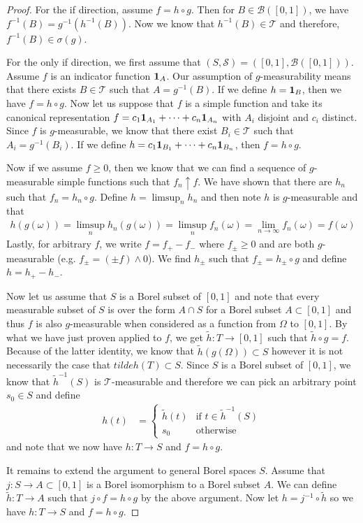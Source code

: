 \documentclass{amsart}
\theoremstyle{remark}
\theoremstyle{definition}
\begin{document}
\begin{proof}
For the if direction, assume $f = h \circ g$.  Then for $B \in
\mathcal{B}([0,1])$, we have $f^{-1}(B) = g^{-1}(h^{-1}(B))$.  Now we know
that $h^{-1}(B) \in \mathcal{T}$ and therefore, $f^{-1}(B) \in
\sigma(g)$.

For the only if direction, we first assume that $(S, \mathcal{S})
=([0,1], \mathcal{B}([0,1]))$.  
Assume $f$ is an indicator
function $\textbf{1}_{A}$.  Our assumption of $g$-measurability
means that there exists $B \in \mathcal{T}$ such that $A =
g^{-1}(B)$.  If we define $h = \textbf{1}_{B}$, then we have $f =
h \circ g$.  Now let us suppose that $f$ is a simple function and take
its canonical representation $f = c_1 \textbf{1}_{A_1} + \cdots + c_n
\textbf{1}_{A_n}$ with $A_i$ disjoint and $c_i$ distinct.  Since $f$ is
$g$-measurable, we know that there exist $B_i \in \mathcal{T}$ such
that $A_i = g^{-1}(B_i)$.  If we define $h=c_1 \textbf{1}_{B_1} + \cdots + c_n
\textbf{1}_{B_n}$, then $f = h \circ g$.

Now if we assume $f \geq 0$, then we know that we can find a sequence
of $g$-measurable simple functions such that $f_n \uparrow f$.  We
have shown that there are $h_n$ such that $f_n = h_n \circ g$.  Define
$h = \limsup_n h_n$ and then note $h$ is $g$-measurable and that 
\begin{align*}
h(g(\omega)) = \limsup_n h_n(g(\omega)) = \limsup_n f_n(\omega) =
\lim_{n \to \infty} f_n(\omega) = f(\omega)
\end{align*}
Lastly, for arbitrary $f$, we write $f = f_+ - f_{-}$ where $f_{\pm}
\geq 0$ and are both $g$-measurable (e.g. $f_{\pm} = (\pm f) \wedge 0$).
We find $h_{\pm}$ such that $f_{\pm} = h_{\pm} \circ g$ and define $h
= h_+ - h_{-}$.

Now let us assume that $S$ is a Borel subset of $[0,1]$ and note that
every measurable subset of $S$ is over the form $A \cap S$ for a Borel
subset $A \subset [0,1]$ and thus $f$ is also
$g$-measurable when considered as a function from $\Omega$ to $[0,1]$.  
By what we have just proven applied to
$f$, we get $\tilde{h} : T \to [0,1]$ such that $\tilde{h}
\circ g = f$.  Because of the latter identity, we know that
$\tilde{h}(g(\Omega)) \subset S$ however it is not necessarily the
case that $tilde{h}(T) \subset S$.  Since $S$ is a Borel subset of
$[0,1]$, we know that $\tilde{h}^{-1}(S)$ is $\mathcal{T}$-measurable
and therefore we can pick an arbitrary point $s_0 \in S$ and define
\begin{align*}
h(t) &= \begin{cases}
\tilde{h}(t) & \text{if $t \in \tilde{h}^{-1}(S)$} \\
s_0 & \text{otherwise}
\end{cases}
\end{align*}
and note that we now have $h : T \to S$ and $f = h \circ g$.

It remains to extend the argument to general Borel spaces $S$.  Assume
that $j : S \to A \subset [0,1]$ is a Borel isomorphism to a Borel
subset $A$.  We can define $\tilde{h}: T \to A$ such that $j \circ f =
h \circ g$ by the above argument.  Now let $h = j^{-1} \circ
\tilde{h}$ so we have $h : T \to S$ and $f = h \circ g$.
\end{proof}
\end{document}
